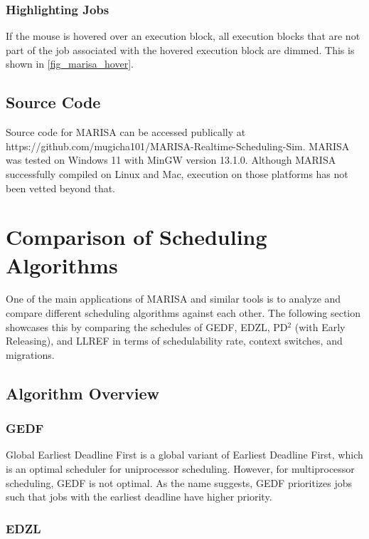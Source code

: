 \documentclass[conference,compsoc]{IEEEtran}
\begin{document}
\subsubsection{Highlighting Jobs} If the mouse is hovered over an execution block, all execution blocks that are not part of the job associated with the hovered execution block are dimmed. This is shown in \ref{fig_marisa_hover}.

\subsection{Source Code}
Source code for MARISA can be accessed publically at https://github.com/mugicha101/MARISA-Realtime-Scheduling-Sim.
MARISA was tested on Windows 11 with MinGW version 13.1.0. Although MARISA successfully compiled on Linux and Mac, execution on those platforms has not been vetted beyond that.

\section{Comparison of Scheduling Algorithms}
One of the main applications of MARISA and similar tools is to analyze and compare different scheduling algorithms against each other. The following section showcases this by comparing the schedules of GEDF, EDZL, PD$^2$ (with Early Releasing), and LLREF in terms of schedulability rate, context switches, and migrations.

\subsection{Algorithm Overview}
\subsubsection{GEDF}
Global Earliest Deadline First is a global variant of Earliest Deadline First, which is an optimal scheduler for uniprocessor scheduling. However, for multiprocessor scheduling, GEDF is not optimal. As the name suggests, GEDF prioritizes jobs such that jobs with the earliest deadline have higher priority.
\subsubsection{EDZL}
\end{document}
